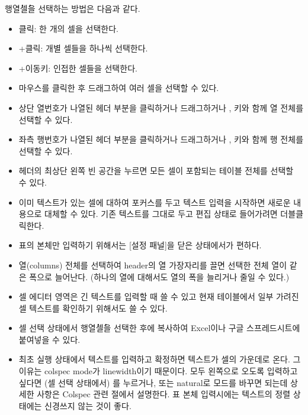\documentclass{simplman}
\begin{document}
행\.열\.셀을 선택하는 방법은 다음과 같다.
\begin{itemize}
\item 클릭: 한 개의 셀을 선택한다.
\item {}+클릭: 개별 셀들을 하나씩 선택한다.
\item {}+이동키: 인접한 셀들을 선택한다.
\item 마우스를 클릭한 후 드래그하여 여러 셀을 선택할 수 있다.
\item 상단 열번호가 나열된 헤더 부분을 클릭하거나 드래그하거나 ,  키와 함께 열 전체를 선택할 수 있다.
\item 좌측 행번호가 나열된 헤더 부분을 클릭하거나 드래그하거나 ,  키와 함께 행 전체를 선택할 수 있다.
\item 헤더의 최상단 왼쪽 빈 공간을 누르면 모든 셀이 포함되는 테이블 전체를 선택할 수 있다.
\end{itemize}

\begin{Chamgo}
\begin{itemize}\oblivoirlist
\item 이미 텍스트가 있는 셀에 대하여 포커스를 두고 텍스트 입력을 시작하면 새로운 내용으로 대체할 수 있다. 기존 텍스트를 그대로 두고 편집 상태로 들어가려면 더블클릭한다.
\item 표의 본체만 입력하기 위해서는 \textcolor{blue4}{[설정 패널]}을 닫은 상태에서가 편하다.
\item 열(columns) 전체를 선택하여 header의 열 가장자리를 끌면 선택한 전체 열이 같은 폭으로 늘어난다. (하나의 열에 대해서도 열의 폭을 늘리거나 줄일 수 있다.)
\item \textcolor{blue4}{셀 에디터 영역}은 긴 텍스트를 입력할 때 쓸 수 있고 현재 테이블에서 일부 가려진 셀 텍스트를 확인하기 위해서도 쓸 수 있다.
\item 셀 선택 상태에서 행\.열\.셀을 선택한 후에 복사하여 Excel이나 구글 스프레드시트에 붙여넣을 수 있다.
\item 최초 실행 상태에서 텍스트를 입력하고 확정하면 텍스트가 셀의 가운데로 온다. 그 이유는 colspec mode가 \textcolor{blue4}{\ttfamily linewidth}이기 때문이다. 모두 왼쪽으로 오도록 입력하고 싶다면 (셀 선택 상태에서) 를 누르거나, 또는 \textcolor{blue4}{\ttfamily natural}로 모드를 바꾸면 되는데 상세한 사항은 Colspec 관련 절에서 설명한다. 표 본체 입력시에는 텍스트의 정렬 상태에는 신경쓰지 않는 것이 좋다.
\end{itemize}
\end{Chamgo}
\end{document}
